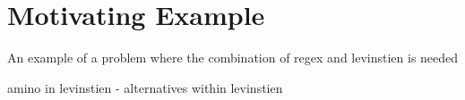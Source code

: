 
\section{Motivating Example}
\label{sec:motivating}

An example of a problem where the combination of regex and levinstien is needed

amino in levinstien - alternatives within levinstien
